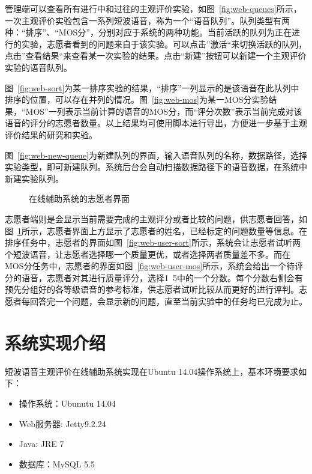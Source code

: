 管理端可以查看所有进行中和过往的主观评价实验，如图~\ref{fig:web-queues}所示，一次主观评价实验包含一系列短波语音，称为一个“语音队列”。队列类型有两种：“排序”、“MOS分”，分别对应于系统的两种功能。当前活跃的队列为正在进行的实验，志愿者看到的问题来自于该实验。可以点击”激活“来切换活跃的队列，点击”查看结果“来查看某一次实验的结果。点击“新建”按钮可以新建一个主观评价实验的语音队列。

图~\ref{fig:web-sort}为某一排序实验的结果，“排序”一列显示的是该语音在此队列中排序的位置，可以存在并列的情况。图~\ref{fig:web-mos}为某一MOS分实验结果，“MOS”一列表示当前计算的语音的MOS分，而“评分次数”表示当前完成对该语音的评分的志愿者数量。以上结果均可使用脚本进行导出，方便进一步基于主观评价结果的研究和实验。

图~\ref{fig:web-new-queue}为新建队列的界面，输入语音队列的名称，数据路径，选择实验类型，即可新建队列。系统后台会自动扫描数据路径下的语音数据，在系统中新建实验队列。

\begin{figure}
\centering
{}
\caption{在线辅助系统的志愿者界面\label{fig:web-user}}
\end{figure}

志愿者端则是会显示当前需要完成的主观评分或者比较的问题，供志愿者回答，如图~\ref{fig:web-user}所示，志愿者界面上方显示了志愿者的姓名，已经标定的问题数量等信息。在排序任务中，志愿者的界面如图~\ref{fig:web-user-sort}所示，系统会让志愿者试听两个短波语音，让志愿者选择哪一个质量更优，或者选择两者质量差不多。而在MOS分任务中，志愿者的界面如图~\ref{fig:web-user-mos}所示，系统会给出一个待评分的语音，志愿者对其进行质量评分，选择1~5中的一个分数。每个分数右侧会有预先分组好的各等级语音的参考标准，供志愿者试听比较从而更好的进行评判。志愿者每回答完一个问题，会显示新的问题，直至当前实验中的任务均已完成为止。

\section{系统实现介绍}

短波语音主观评价在线辅助系统实现在Ubuntu 14.04操作系统上，基本环境要求如下：
\begin{itemize}
    \item 操作系统：Ubunutu 14.04
    \item Web服务器: Jetty9.2.24
    \item Java: JRE 7
    \item 数据库：MySQL 5.5
\end{itemize}


